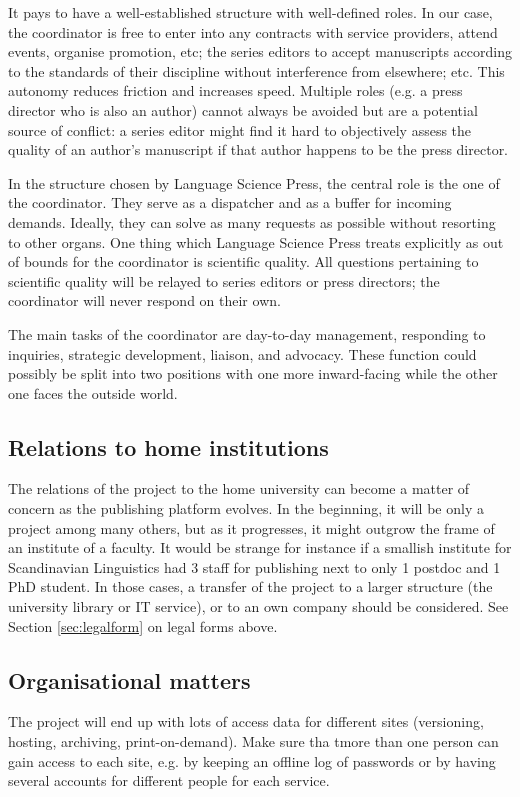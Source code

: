 \documentclass[guidelines,nonflat,modfonts] {langsci/langscibook}
\begin{document}
It pays to have a well-established structure with well-defined roles. In our case, the coordinator is free to enter into any contracts with service providers, attend events, organise promotion, etc; the series editors to accept manuscripts according to the standards of their discipline without interference from elsewhere; etc.  This autonomy reduces friction and increases speed. Multiple roles (e.g. a press director who is also an author) cannot always be avoided but are a potential source of conflict: a series editor might find it hard to objectively assess the quality of an author's manuscript if that author happens to be the press director. 

In the structure chosen by Language Science Press, the central role is the one of the coordinator. They serve as a dispatcher and as a buffer for incoming demands. Ideally, they can solve as many requests as possible without resorting to other organs. One thing which Language Science Press treats explicitly as out of bounds for the coordinator is scientific quality. All questions pertaining to scientific quality will be relayed to series editors or press directors; the coordinator will never respond on their own. 

The main tasks of the coordinator are day-to-day management, responding to inquiries, strategic development, liaison, and advocacy. These function could possibly be split into two positions with one more inward-facing while the other one faces the outside world. 

\subsection{Relations to home institutions}
The relations of the project to the home university can become a matter of concern as the publishing platform evolves. In the beginning, it will be only a project among many others, but as it progresses, it might outgrow the frame of an institute of a faculty. It would be strange for instance if  a smallish institute for Scandinavian Linguistics had 3 staff for publishing next to only 1 postdoc and 1 PhD student. In those cases, a transfer of the project to a larger structure (the university library or IT service), or to an own company should be considered. See Section \ref{sec:legalform} on legal forms above. 

\subsection{Organisational matters}
The project will end up with lots of access data for different sites (versioning, hosting, archiving, print-on-demand). Make sure tha tmore than one person can gain access to each site, e.g. by keeping an offline log of passwords or by having several accounts for different people for each service. 
\end{document}
